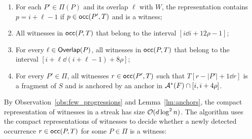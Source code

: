 \begin{enumerate}
\item For each $P' \in \Pi(P)$ and its overlap $\ell$ with $W$, the representation contains $p = i+\ell-1$ if $p \in \mathsf{occ}(P',T)$ and is a witness;
\item All witnesses in $\mathsf{occ}(P,T)$ that belong to the interval $[i \dd  i+12 \rho-1]$;
\item For every $\ell \in \mathsf{Overlap}(P)$, all witnesses in $\mathsf{occ}(P,T)$ that belong to the interval $[i+\ell \dd  (i+\ell-1)+8 \rho]$;
\item For every $P' \in \Pi$, all witnesses $r \in \mathsf{occ}(P',T)$ such that $T[r-|P'|+1\dd r]$ is a fragment of $S$ and is anchored by an anchor in $\mathcal{A}^\ast(F) \cap [i,i+4\rho]$. 
\end{enumerate}

By Observation~\ref{obs:few_progressions} and Lemma~\ref{lm:anchors}, the compact representation of witnesses in a streak has size $\mathcal{O}(d \log^2n)$. The algorithm uses the compact representations of witnesses to decide whether a newly detected occurrence $r \in \mathsf{occ}(P,T)$ for some $P \in \Pi$ is a witness:

